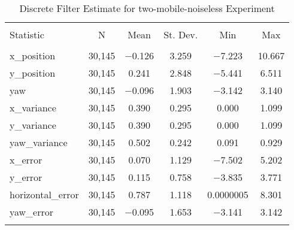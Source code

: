 
\begin{table}[h] \centering 
  \caption{Discrete Filter Estimate for two-mobile-noiseless Experiment} 
  \label{tab:two_mobile_noiseless_discrete_summary} 
\begin{tabular}{@{\extracolsep{5pt}}lccccc} 
\\[-1.8ex]\hline 
\hline \\[-1.8ex] 
Statistic & \multicolumn{1}{c}{N} & \multicolumn{1}{c}{Mean} & \multicolumn{1}{c}{St. Dev.} & \multicolumn{1}{c}{Min} & \multicolumn{1}{c}{Max} \\ 
\hline \\[-1.8ex] 
x\_position & 30,145 & $-$0.126 & 3.259 & $-$7.223 & 10.667 \\ 
y\_position & 30,145 & 0.241 & 2.848 & $-$5.441 & 6.511 \\ 
yaw & 30,145 & $-$0.096 & 1.903 & $-$3.142 & 3.140 \\ 
x\_variance & 30,145 & 0.390 & 0.295 & 0.000 & 1.099 \\ 
y\_variance & 30,145 & 0.390 & 0.295 & 0.000 & 1.099 \\ 
yaw\_variance & 30,145 & 0.502 & 0.242 & 0.091 & 0.929 \\ 
x\_error & 30,145 & 0.070 & 1.129 & $-$7.502 & 5.202 \\ 
y\_error & 30,145 & 0.115 & 0.758 & $-$3.835 & 3.771 \\ 
horizontal\_error & 30,145 & 0.787 & 1.118 & 0.0000005 & 8.301 \\ 
yaw\_error & 30,145 & $-$0.095 & 1.653 & $-$3.141 & 3.142 \\ 
\hline \\[-1.8ex] 
\end{tabular} 
\end{table} 
